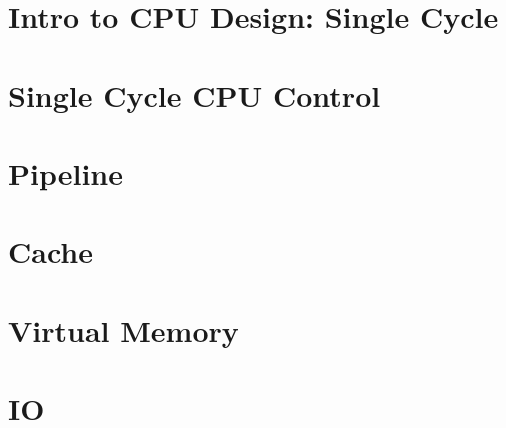 \documentclass[en,11pt,english,black,simple,device=ppt]{elegantbook}
\begin{document}
 


\section{Intro to CPU Design: Single Cycle}

 

 

\section{Single Cycle CPU Control} 

 

\section{Pipeline}

 

 

\section{Cache}

 

 

 

\section{Virtual Memory}

 

 

\section{IO}

 
\end{document}
